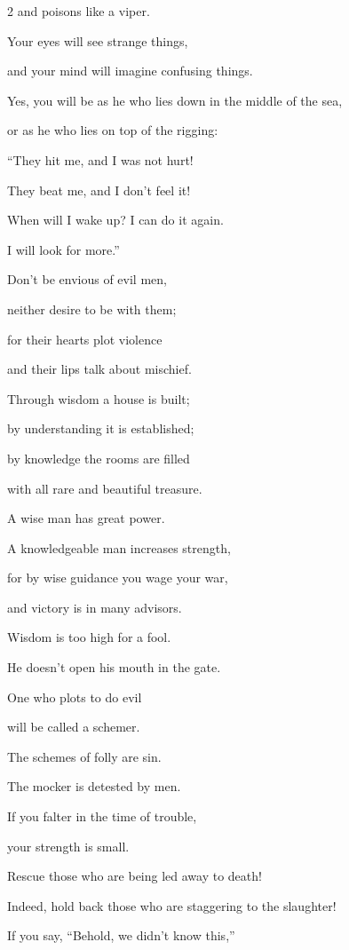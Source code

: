 \begin{multicols}{2}
and poisons like a viper.


\myverse{}Your eyes will see strange things,

and your mind will imagine confusing things.


\myverse{}Yes, you will be as he who lies down in the middle of the sea,

or as he who lies on top of the rigging:


\myverse{}“They hit me, and I was not hurt!

They beat me, and I don’t feel it!

When will I wake up? I can do it again.

I will look for more.”


\mychapter{} \myverse*{}Don’t be envious of evil men,

\quad\quad neither desire to be with them;


\myverse{}for their hearts plot violence

and their lips talk about mischief.


\myverse{}Through wisdom a house is built;

by understanding it is established;


\myverse{}by knowledge the rooms are filled

with all rare and beautiful treasure.


\myverse{}A wise man has great power.

A knowledgeable man increases strength,


\myverse{}for by wise guidance you wage your war,

and victory is in many advisors.


\myverse{}Wisdom is too high for a fool.

He doesn’t open his mouth in the gate.


\myverse{}One who plots to do evil

will be called a schemer.


\myverse{}The schemes of folly are sin.

The mocker is detested by men.


\myverse{}If you falter in the time of trouble,

your strength is small.


\myverse{}Rescue those who are being led away to death!

Indeed, hold back those who are staggering to the slaughter!


\myverse{}If you say, “Behold, we didn’t know this,”


\end{multicols}
